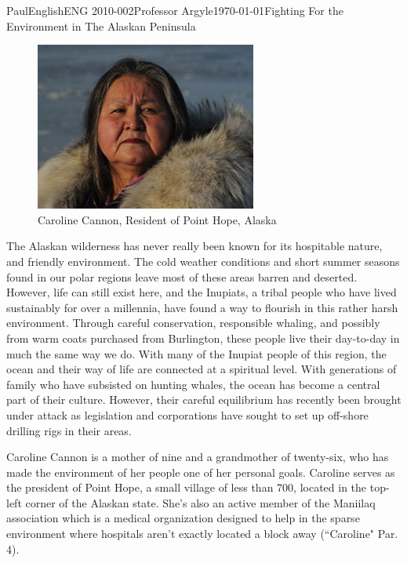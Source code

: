 \documentclass[12pt,letterpaper]{article}
\begin{document}
\begin{mla}{Paul}{English}{ENG 2010-002}{Professor Argyle}{\today}{Fighting For the Environment in The Alaskan Peninsula}

\begin{figure}
  \begin{center}
    \includegraphics[scale=0.5]{2012_nam_cannon.jpeg}
  \end{center}
  \caption{Caroline Cannon, Resident of Point Hope, Alaska}
\end{figure}


The Alaskan wilderness has never really been known for its hospitable nature, and friendly environment. The cold weather conditions and short summer seasons found in our polar regions leave most of these areas barren and deserted. However, life can still exist here, and the Inupiats, a tribal people who have lived sustainably for over a millennia, have found a way to flourish in this rather harsh environment. Through careful conservation, responsible whaling, and possibly from warm coats purchased from Burlington, these people live their day-to-day in much the same way we do. With many of the Inupiat people of this region, the ocean and their way of life are connected at a spiritual level. With generations of family who have subsisted on hunting whales, the ocean has become a central part of their culture. However, their careful equilibrium has recently been brought under attack as legislation and corporations have sought to set up off-shore drilling rigs in their areas.

Caroline Cannon is a mother of nine and a grandmother of twenty-six, who has made the environment of her people one of her personal goals. Caroline serves as the president of Point Hope, a small village of less than 700, located in the top-left corner of the Alaskan state. She's also an active member of the Maniilaq association which is a medical organization designed to help in the sparse environment where hospitals aren't exactly located a block away (``Caroline" Par. 4).


\end{mla}
\end{document}
